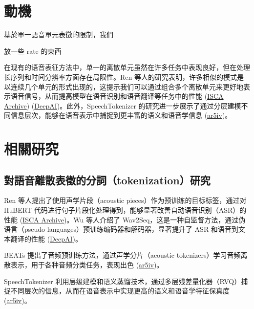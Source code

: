 
\section{動機}

基於單一語音單元表徵的限制，我們

放一些 rate 的東西


在现有的语音表征方法中，单一的离散单元虽然在许多任务中表现良好，但在处理长序列和时间分辨率方面存在局限性。Ren 等人的研究表明，许多相似的模式是以连续几个单元的形式出现的，这提示我们可以通过组合多个离散单元来更好地表示语音信号，从而提高模型在语音识别和语音翻译等任务中的性能 (\href{https://www.isca-archive.org/interspeech_2022/ren22_interspeech.html}{ISCA Archive}) (\href{https://deepai.org/publication/speech-pre-training-with-acoustic-piece}{DeepAI})。此外，SpeechTokenizer 的研究进一步展示了通过分层建模不同信息层次，能够在语音表示中捕捉到更丰富的语义和语音学信息 (\href{https://ar5iv.org/pdf/2308.16692}{ar5iv})。 


\section{相關研究}

\subsection{對語音離散表徵的分詞（tokenization）研究}

Ren 等人提出了使用声学片段（acoustic pieces）作为预训练的目标标签，通过对 HuBERT 代码进行句子片段化处理得到，能够显著改善自动语音识别（ASR）的性能 (\href{https://www.isca-archive.org/interspeech_2022/ren22_interspeech.html}{ISCA Archive})。Wu 等人介绍了 Wav2Seq，这是一种自监督方法，通过伪语言（pseudo languages）预训练编码器和解码器，显著提升了 ASR 和语音到文本翻译的性能 (\href{https://deepai.org/publication/speech-pre-training-with-acoustic-piece}{DeepAI})。

BEATs 提出了音频预训练方法，通过声学分片（acoustic tokenizers）学习音频离散表示，用于各种音频分类任务，表现出色 (\href{https://ar5iv.org/abs/2212.09058}{ar5iv})。

SpeechTokenizer 利用层级建模和语义蒸馏技术，通过多层残差量化器（RVQ）捕捉不同层次的信息，从而在语音表示中实现更高的语义和语音学特征保真度 (\href{https://ar5iv.org/pdf/2308.16692}{ar5iv})。

